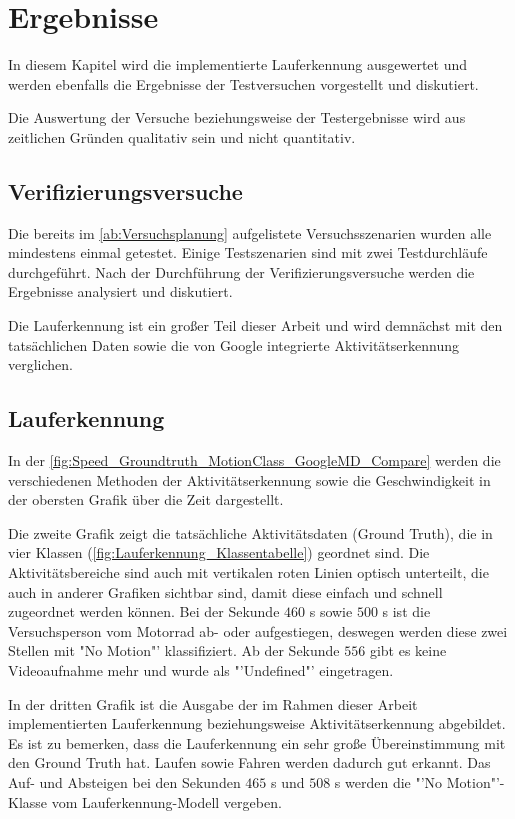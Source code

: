 \chapter{Ergebnisse}

In diesem Kapitel wird die implementierte Lauferkennung ausgewertet und werden ebenfalls die Ergebnisse der Testversuchen vorgestellt und diskutiert.

Die Auswertung der Versuche beziehungsweise der Testergebnisse wird aus zeitlichen Gründen qualitativ sein und nicht quantitativ.


\section{Verifizierungsversuche}

Die bereits im \autoref{ab:Versuchsplanung} aufgelistete Versuchsszenarien wurden alle mindestens einmal getestet. Einige Testszenarien sind mit zwei Testdurchläufe durchgeführt.
Nach der Durchführung der Verifizierungsversuche werden die Ergebnisse analysiert und diskutiert. 

Die Lauferkennung ist ein großer Teil dieser Arbeit und wird demnächst mit den tatsächlichen Daten sowie die von Google integrierte Aktivitätserkennung verglichen.
\section{Lauferkennung}

In der \autoref{fig:Speed_Groundtruth_MotionClass_GoogleMD_Compare} werden die verschiedenen Methoden der Aktivitätserkennung sowie die Geschwindigkeit in der obersten Grafik über die Zeit dargestellt.

Die zweite Grafik zeigt die tatsächliche Aktivitätsdaten (Ground Truth), die in vier Klassen (\autoref{fig:Lauferkennung_Klassentabelle}) geordnet sind. Die Aktivitätsbereiche sind auch mit vertikalen roten Linien optisch unterteilt, die auch in anderer Grafiken sichtbar sind, damit diese einfach und schnell zugeordnet werden können. Bei der Sekunde $460$ s sowie $500$ s ist die Versuchsperson vom Motorrad ab- oder aufgestiegen, deswegen werden diese zwei Stellen mit "No Motion"' klassifiziert. Ab der Sekunde $556$ gibt es keine Videoaufnahme mehr und wurde als "'Undefined"' eingetragen.

In der dritten Grafik ist die Ausgabe der im Rahmen dieser Arbeit implementierten Lauferkennung beziehungsweise Aktivitätserkennung abgebildet. 
Es ist zu bemerken, dass die Lauferkennung ein sehr große Übereinstimmung mit den Ground Truth hat. Laufen sowie Fahren werden dadurch gut erkannt. Das Auf- und Absteigen bei den Sekunden $465$ s und $508$ s werden die "'No Motion"'-Klasse vom Lauferkennung-Modell vergeben.

